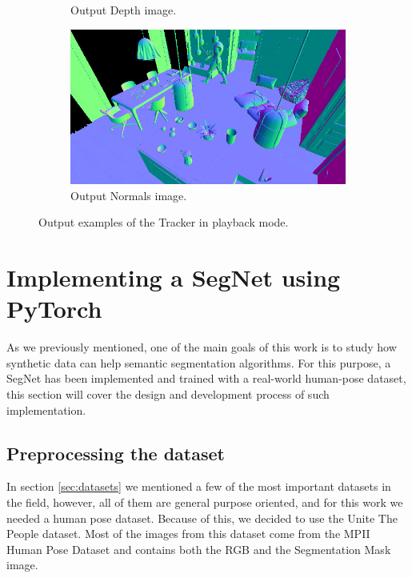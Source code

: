 \begin{figure}
\begin{subfigure}[b]{0.475\textwidth}
		\caption[Output Depth image.]%
		{{\small Output Depth image.}}    
		\label{fig:generated_depth}
	\end{subfigure}
	\quad
	\begin{subfigure}[b]{0.475\textwidth}   
		\centering 
		\includegraphics[width=\textwidth]{archivos/generated_normals.png}
		\caption[Output Normals image.]%
		{{\small Output Normals image.}}    
		\label{fig:generated_normals}
	\end{subfigure}
	\caption{Output examples of the Tracker in playback mode.}
	\label{fig:playback_output}
\end{figure}

\section{Implementing a SegNet using PyTorch}
\label{sec:segnet}
As we previously mentioned, one of the main goals of this work is to study how synthetic data can help semantic segmentation algorithms. For this purpose, a SegNet has been implemented and trained with a real-world human-pose dataset, this section will cover the design and development process of such implementation.

\subsection{Preprocessing the dataset}
\label{sec:preprocess}
In section \ref{sec:datasets} we mentioned a few of the most important datasets in the field, however, all of them are general purpose oriented, and for this work we needed a human pose dataset. Because of this, we decided to use the Unite The People \cite{} dataset. Most of the images from this dataset come from the MPII Human Pose Dataset and contains both the RGB and the Segmentation Mask image.


